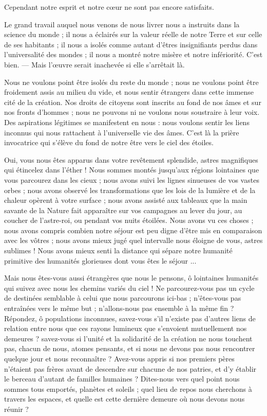 \documentclass[a4paper, 11pt, oneside]{article}
\begin{document}
Cependant notre esprit et notre cœur ne sont pas encore satisfaits.

Le grand travail auquel nous venons de nous livrer nous a instruits dans la science du monde ; il nous a éclairés sur la valeur réelle de notre Terre et sur celle de ses habitants ; il nous a isolés comme autant d'êtres insignifiants perdus dans l'universalité des mondes ; il nous a montré notre misère et notre infériorité. C'est bien. --- Mais l'œuvre serait inachevée si elle s'arrêtait là.

Nous ne voulons point être isolés du reste du monde ; nous ne voulons point être froidement assis au milieu du vide, et nous sentir étrangers dans cette immense cité de la création. Nos droits de citoyens sont inscrits au fond de nos âmes et sur nos fronts d'hommes ; nous ne pouvons ni ne voulons nous soustraire à leur voix. Des aspirations légitimes se manifestent en nous : nous voulons sentir les liens inconnus qui nous rattachent à l'universelle vie des âmes. C'est là la prière invocatrice qui s'élève du fond de notre être vers le ciel des étoiles.

Oui, vous nous êtes apparus dans votre revêtement splendide, astres magnifiques qui étincelez dans l'éther ! Nous sommes montés jusqu'aux régions lointaines que vous parcourez dans les cieux ; nous avons suivi les lignes sinueuses de vos vastes orbes ; nous avons observé les transformations que les lois de la lumière et de la chaleur opèrent à votre surface ; nous avons assisté aux tableaux que la main savante de la Nature fait apparaître sur vos campagnes au lever du jour, au coucher de l'astre-roi, ou pendant vos nuits étoilées. Nous avons vu ces choses ; nous avons compris combien notre séjour est peu digne d'être mis en comparaison avec les vôtres ; nous avons mieux jugé quel intervalle nous éloigne de vous, astres sublimes ! Nous avons mieux senti la distance qui sépare notre humanité primitive des humanités glorieuses dont vous êtes le séjour ...

Mais nous êtes-vous aussi étrangères que nous le pensons, ô lointaines humanités qui suivez avec nous les chemins variés du ciel ! Ne parcourez-vous pas un cycle de destinées semblable à celui que nous parcourons ici-bas ; n'êtes-vous pas entraînées vers le même but ; n'allons-nous pas ensemble à la même fin ? Répondez, ô populations inconnues, savez-vous s'il n'existe pas d'autres liens de relation entre nous que ces rayons lumineux que s'envoient mutuellement nos demeures ? savez-vous si l'unité et la solidarité de la création ne nous touchent pas, chacun de nous, atomes pensants, et si nous ne devons pas nous rencontrer quelque jour et nous reconnaître ? Avez-vous appris si nos premiers pères n'étaient pas frères avant de descendre sur chacune de nos patries, et d'y établir le berceau d'autant de familles humaines ? Dites-nous vers quel point nous sommes tous emportés, planètes et soleils ; quel lieu de repos nous cherchons à travers les espaces, et quelle est cette dernière demeure où nous devons nous réunir ?
\end{document}
